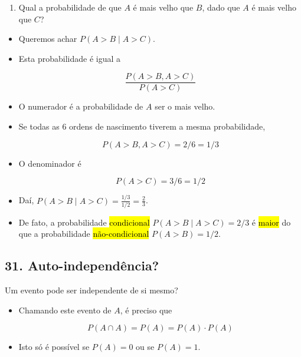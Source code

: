 \documentclass[
  11pt]{report}
\providecommand{\tightlist}{%
  \setlength{\itemsep}{0pt}\setlength{\parskip}{0pt}}
\begin{document}
\begin{rmdbox}

\begin{enumerate}
\def\labelenumi{\alph{enumi}.}
\setcounter{enumi}{1}
\tightlist
\item
  Qual a probabilidade de que $A$ é mais velho que $B$, dado que $A$ é mais velho que $C$?
\end{enumerate}

\end{rmdbox}

\begin{itemize}
\item
  Queremos achar $P(A > B \mid A > C)$.
\item
  Esta probabilidade é igual a

  \[
  \frac{P(A > B,  A > C)}{P(A > C)}
  \]
\item
  O numerador é a probabilidade de $A$ ser o mais velho.
\item
  Se todas as $6$ ordens de nascimento tiverem a mesma probabilidade,

  \[
  P(A > B,  A > C) = 2/6 = 1/3
  \]
\item
  O denominador é

  \[
  P(A > C) = 3/6 = 1/2
  \]
\item
  Daí, $P(A > B \mid A > C) = \frac{1/3}{1/2} = \frac23$.
\item
  De fato, a probabilidade {\hl{condicional}} $P(A > B \mid A > C) = 2/3$ é {\hl{maior}} do que a probabilidade {\hl{não-condicional}} $P(A > B) = 1/2$.
\end{itemize}

\hypertarget{auto-independuxeancia}{%
\subsection*{31. Auto-independência?}\label{auto-independuxeancia}}

\begin{rmdbox}
Um evento pode ser independente de si mesmo?

\end{rmdbox}

\begin{itemize}
\item
  Chamando este evento de $A$, é preciso que

  \[
  P(A \cap A) = P(A) = P(A) \cdot P(A)
  \]
\item
  Isto só é possível se $P(A) = 0$ ou se $P(A) = 1$.
\end{itemize}
\end{document}
